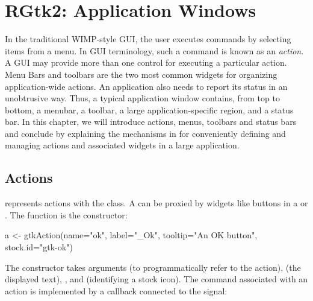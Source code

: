 




\chapter{RGtk2: Application Windows}
\label{sec:RGtk2-menus}


In the traditional WIMP-style GUI, the user executes commands by
selecting items from a menu. In GUI terminology, such a command is
known as an \textit{action}. A GUI may provide more than one control
for executing a particular action. Menu Bars and toolbars are the two
most common widgets for organizing application-wide actions. An
application also needs to report its status in an unobtrusive
way. Thus, a typical application window contains, from top to bottom, 
a menubar, a toolbar, a large application-specific region, and a
status bar.  In this chapter, we will introduce actions, menus,
toolbars and status bars and conclude by explaining the mechanisms in
\GTK\/ for conveniently defining and managing actions and associated
widgets in a large application.


\section{Actions}
\label{sec:RGtk2:actions}


\GTK\/ represents actions with the  class. A
 can be proxied by widgets like buttons in a
 or .  The 
function is the constructor:
\begin{Schunk}
\begin{Sinput}
 a <- gtkAction(name="ok", label="_Ok", 
                tooltip="An OK button", stock.id="gtk-ok")
\end{Sinput}
\end{Schunk}
%
The constructor takes arguments  (to
programmatically refer to the action), 
(the displayed text), , and
 (identifying a stock icon).  The
command associated with an action is implemented by a callback
connected to the  signal:
\begin{Schunk}
\end{Schunk}


